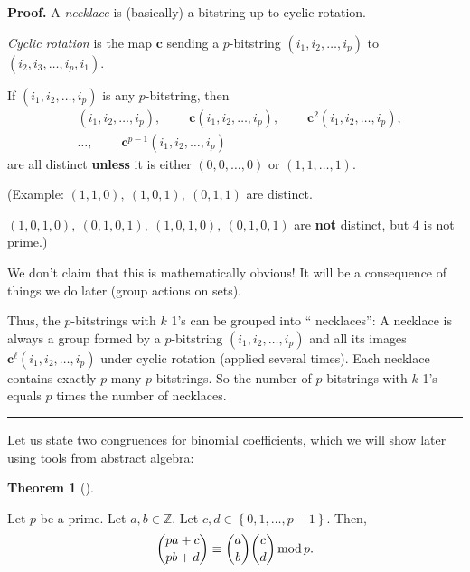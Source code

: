\documentclass[numbers=enddot,12pt,final,onecolumn,notitlepage]{scrartcl}%
\numberwithin{exer}{subsection}
\theoremstyle{definition}
\newtheorem{theo}{Theorem}[subsection]
\newenvironment{theorem}[1][]
{\begin{theo}[#1]\begin{leftbar}}
{\end{leftbar}\end{theo}}
\newenvironment{proof}[1][Proof]{\noindent\textbf{#1.} }{\ \rule{0.5em}{0.5em}}
\newenvironment{noncompile}{}{}
\begin{document}
\begin{noncompile}
\begin{proof}
A \textit{necklace} is (basically) a bitstring up to cyclic rotation.

\textit{Cyclic rotation} is the map $\mathbf{c}$ sending a $p$-bitstring
$\left(  i_{1},i_{2},\ldots,i_{p}\right)  $ to $\left(  i_{2},i_{3}%
,\ldots,i_{p},i_{1}\right)  $.

If $\left(  i_{1},i_{2},\ldots,i_{p}\right)  $ is any $p$-bitstring, then
\begin{align*}
&  \left(  i_{1},i_{2},\ldots,i_{p}\right)  ,\ \ \ \ \ \ \ \ \ \ \mathbf{c}%
\left(  i_{1},i_{2},\ldots,i_{p}\right)  ,\ \ \ \ \ \ \ \ \ \ \mathbf{c}%
^{2}\left(  i_{1},i_{2},\ldots,i_{p}\right)  ,\\
&  \ldots,\ \ \ \ \ \ \ \ \ \ \mathbf{c}^{p-1}\left(  i_{1},i_{2},\ldots
,i_{p}\right)
\end{align*}
are all distinct \textbf{unless} it is either $\left(  0,0,\ldots,0\right)  $
or $\left(  1,1,\ldots,1\right)  $.

(Example: $\left(  1,1,0\right)  ,\ \left(  1,0,1\right)  ,\ \left(
0,1,1\right)  $ are distinct.

$\left(  1,0,1,0\right)  ,\ \left(  0,1,0,1\right)  ,\ \left(  1,0,1,0\right)
,\ \left(  0,1,0,1\right)  $ are \textbf{not} distinct, but $4$ is not prime.)

We don't claim that this is mathematically obvious! It will be a consequence
of things we do later (group actions on sets).

Thus, the $p$-bitstrings with $k$ 1's can be grouped into \textquotedblleft
necklaces\textquotedblright: A necklace is always a group formed by a
$p$-bitstring $\left(  i_{1},i_{2},\ldots,i_{p}\right)  $ and all its images
$\mathbf{c}^{\ell}\left(  i_{1},i_{2},\ldots,i_{p}\right)  $ under cyclic
rotation (applied several times). Each necklace contains exactly $p$ many
$p$-bitstrings. So the number of $p$-bitstrings with $k$ 1's equals $p$ times
the number of necklaces.
\end{proof}
\end{noncompile}

Let us state two congruences for binomial coefficients, which we will show
later using tools from abstract algebra:

\begin{theorem}
[Lucas's congruence]\label{thm.binom.lucas}Let $p$ be a prime. Let
$a,b\in\mathbb{Z}$. Let $c,d\in\left\{  0,1,\ldots,p-1\right\}  $. Then,%
\[
\dbinom{pa+c}{pb+d}\equiv\dbinom{a}{b}\dbinom{c}{d}\operatorname{mod}p.
\]

\end{theorem}
\end{document}
